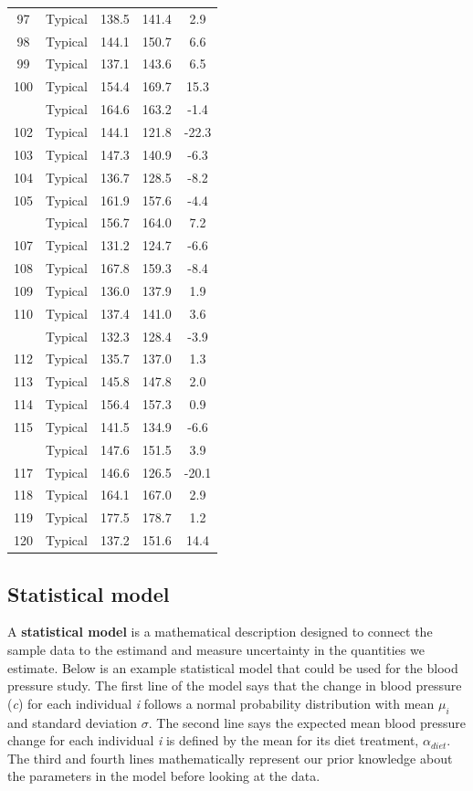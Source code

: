 \documentclass[
]{book}
\begin{document}
\begin{table}[!h]
{\begin{tabular}[t]{ccccc}
97 & Typical & 138.5 & 141.4 & 2.9\\
98 & Typical & 144.1 & 150.7 & 6.6\\
99 & Typical & 137.1 & 143.6 & 6.5\\
100 & Typical & 154.4 & 169.7 & 15.3\\
\addlinespace
101 & Typical & 164.6 & 163.2 & -1.4\\
102 & Typical & 144.1 & 121.8 & -22.3\\
103 & Typical & 147.3 & 140.9 & -6.3\\
104 & Typical & 136.7 & 128.5 & -8.2\\
105 & Typical & 161.9 & 157.6 & -4.4\\
\addlinespace
106 & Typical & 156.7 & 164.0 & 7.2\\
107 & Typical & 131.2 & 124.7 & -6.6\\
108 & Typical & 167.8 & 159.3 & -8.4\\
109 & Typical & 136.0 & 137.9 & 1.9\\
110 & Typical & 137.4 & 141.0 & 3.6\\
\addlinespace
111 & Typical & 132.3 & 128.4 & -3.9\\
112 & Typical & 135.7 & 137.0 & 1.3\\
113 & Typical & 145.8 & 147.8 & 2.0\\
114 & Typical & 156.4 & 157.3 & 0.9\\
115 & Typical & 141.5 & 134.9 & -6.6\\
\addlinespace
116 & Typical & 147.6 & 151.5 & 3.9\\
117 & Typical & 146.6 & 126.5 & -20.1\\
118 & Typical & 164.1 & 167.0 & 2.9\\
119 & Typical & 177.5 & 178.7 & 1.2\\
120 & Typical & 137.2 & 151.6 & 14.4\\
\bottomrule
\end{tabular}}
\end{table}

\subsection{Statistical model}\label{statistical-model}

A \textbf{statistical model} is a mathematical description designed to connect the sample data to the estimand and measure uncertainty in the quantities we estimate. Below is an example statistical model that could be used for the blood pressure study. The first line of the model says that the change in blood pressure (\emph{c}) for each individual \emph{i} follows a normal probability distribution with mean \(\mu_i\) and standard deviation \(\sigma\). The second line says the expected mean blood pressure change for each individual \emph{i} is defined by the mean for its diet treatment, \(\alpha_{diet}\). The third and fourth lines mathematically represent our prior knowledge about the parameters in the model before looking at the data.
\end{document}

